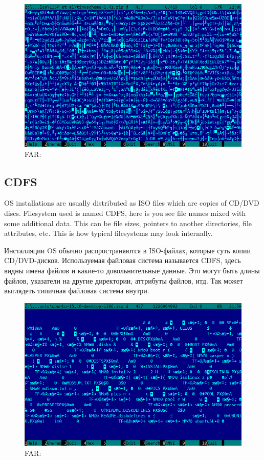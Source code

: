 \begin{figure}[H]
\centering
\includegraphics[scale=\NormalScale]{digging_into_code/binary/compressed.png}
\caption{FAR: }
\end{figure}

\clearpage
\subsection{\ac{CDFS}}

\ifdefined\ENGLISH
\ac{OS} installations are usually distributed as ISO files which are copies of CD/DVD discs.
Filesystem used is named \ac{CDFS}, here is you see file names mixed with some additional data.
This can be file sizes, pointers to another directories, file attributes, etc.
This is how typical filesystems may look internally.
\fi %

\ifdefined\RUSSIAN
Инсталляции \ac{OS} обычно распространяются в ISO-файлах, которые суть копии CD/DVD-дисков.
Используемая файловая система называется \ac{CDFS}, здесь видны имена файлов и какие-то довольнительные данные.
Это могут быть длины файлов, указатели на другие директории, аттрибуты файлов, итд.
Так может выглядеть типичная файловая система внутри.
\fi %

\begin{figure}[H]
\centering
\includegraphics[scale=\NormalScale]{digging_into_code/binary/cdfs.png}
\caption{FAR: }
\end{figure}

